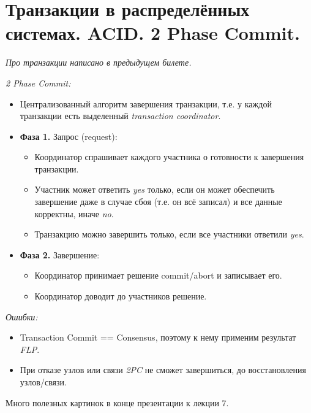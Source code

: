 \section{Транзакции в распределённых системах. ACID. 2 Phase Commit.}

\textit{Про транзакции написано в предыдущем билете.}

\begin{definition} \textit{2 Phase Commit:}
    \begin{itemize}
        \item Централизованный алгоритм завершения транзакции, т.е.
            у каждой транзакции есть выделенный \textit{transaction coordinator}.
        \item \textbf{Фаза 1.} Запрос (request):
            \begin{itemize}
                \item Координатор спрашивает каждого участника о готовности к завершения транзакции.
                \item Участник может ответить \textit{yes} только, если он может обеспечить
                    завершение даже в случае сбоя (т.е. он всё записал) и все данные корректны, иначе \textit{no}.
                \item Транзакцию можно завершить только, если все участники ответили \textit{yes}.
            \end{itemize}
        \item \textbf{Фаза 2.} Завершение:
            \begin{itemize}
                \item Координатор принимает решение commit/abort и записывает его.
                \item Координатор доводит до участников решение.
            \end{itemize}
    \end{itemize}
\end{definition}

\begin{remark} \textit{Ошибки:}
    \begin{itemize}
        \item Transaction Commit == Consensus, поэтому к нему применим результат \textit{FLP}.
        \item При отказе узлов или связи \textit{2PC} не сможет завершиться, до восстановления узлов/связи.
    \end{itemize}
\end{remark}

\begin{remark}
    Много полезных картинок в конце презентации к лекции 7.
\end{remark}